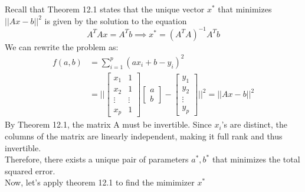 \documentclass{article}
\begin{document}
\begin{enumerate}
Recall that Theorem 12.1 states that the unique vector $x^*$ that minimizes $||Ax-b||^2$ is given by the solution to the equation
\[ A^TAx = A^Tb \implies x^* = (A^TA)^{-1} A^T b\]
We can rewrite the problem as:
\begin{align*}
    f(a,b) &= \sum_{i=1}^{p}(ax_i + b - y_i)^2 \\
    &= ||\begin{bmatrix}
        x_1 & 1 \\
        x_2 & 1 \\
        \vdots & \vdots \\
        x_p & 1
        \end{bmatrix}
        \begin{bmatrix}
            a \\ b
        \end{bmatrix} - \begin{bmatrix}
            y_1 \\ y_2 \\ \vdots \\ y_p
        \end{bmatrix}||^2 = ||Ax-b||^2
\end{align*}
By Theorem 12.1, the matrix A must be invertible. Since $x_i$'s are distinct, the columns of the matrix are linearly independent, making it full rank and thus invertible. 
    \\Therefore, there exists a unique pair of parameters $a^*, b^*$ that minimizes the total squared error.
    \\Now, let's apply theorem 12.1 to find the mimimizer $x^*$


\end{enumerate}
\end{document}
